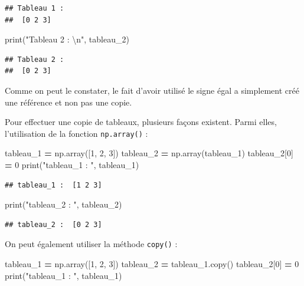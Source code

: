\documentclass[
  12pt,
]{book}
\newenvironment{Shaded}{\begin{snugshade}}{\end{snugshade}}
\newcommand{\BuiltInTok}[1]{#1}
\newcommand{\CharTok}[1]{\textcolor[rgb]{0.31,0.60,0.02}{#1}}
\newcommand{\DecValTok}[1]{\textcolor[rgb]{0.00,0.00,0.81}{#1}}
\newcommand{\NormalTok}[1]{#1}
\newcommand{\OperatorTok}[1]{\textcolor[rgb]{0.81,0.36,0.00}{\textbf{#1}}}
\newcommand{\StringTok}[1]{\textcolor[rgb]{0.31,0.60,0.02}{#1}}
\numberwithin{equation}{section}
\numberwithin{countremarque}{section}
\begin{document}
\begin{lstlisting}
## Tableau 1 : 
##  [0 2 3]
\end{lstlisting}

\begin{Shaded}
\begin{Highlighting}[]
\BuiltInTok{print}\NormalTok{(}\StringTok{"Tableau 2 : }\CharTok{\textbackslash{}n}\StringTok{"}\NormalTok{, tableau\_2)}
\end{Highlighting}
\end{Shaded}

\begin{lstlisting}
## Tableau 2 : 
##  [0 2 3]
\end{lstlisting}

Comme on peut le constater, le fait d'avoir utilisé le signe égal a simplement créé une référence et non pas une copie.

Pour effectuer une copie de tableaux, plusieurs façons existent. Parmi elles, l'utilisation de la fonction \texttt{np.array()} :

\begin{Shaded}
\begin{Highlighting}[]
\NormalTok{tableau\_1 }\OperatorTok{=}\NormalTok{ np.array([}\DecValTok{1}\NormalTok{, }\DecValTok{2}\NormalTok{, }\DecValTok{3}\NormalTok{])}
\NormalTok{tableau\_2 }\OperatorTok{=}\NormalTok{ np.array(tableau\_1)}
\NormalTok{tableau\_2[}\DecValTok{0}\NormalTok{] }\OperatorTok{=} \DecValTok{0}
\BuiltInTok{print}\NormalTok{(}\StringTok{"tableau\_1 : "}\NormalTok{, tableau\_1)}
\end{Highlighting}
\end{Shaded}

\begin{lstlisting}
## tableau_1 :  [1 2 3]
\end{lstlisting}

\begin{Shaded}
\begin{Highlighting}[]
\BuiltInTok{print}\NormalTok{(}\StringTok{"tableau\_2 : "}\NormalTok{, tableau\_2)}
\end{Highlighting}
\end{Shaded}

\begin{lstlisting}
## tableau_2 :  [0 2 3]
\end{lstlisting}

On peut également utiliser la méthode \texttt{copy()} :

\begin{Shaded}
\begin{Highlighting}[]
\NormalTok{tableau\_1 }\OperatorTok{=}\NormalTok{ np.array([}\DecValTok{1}\NormalTok{, }\DecValTok{2}\NormalTok{, }\DecValTok{3}\NormalTok{])}
\NormalTok{tableau\_2 }\OperatorTok{=}\NormalTok{ tableau\_1.copy()}
\NormalTok{tableau\_2[}\DecValTok{0}\NormalTok{] }\OperatorTok{=} \DecValTok{0}
\BuiltInTok{print}\NormalTok{(}\StringTok{"tableau\_1 : "}\NormalTok{, tableau\_1)}
\end{Highlighting}
\end{Shaded}
\end{document}
